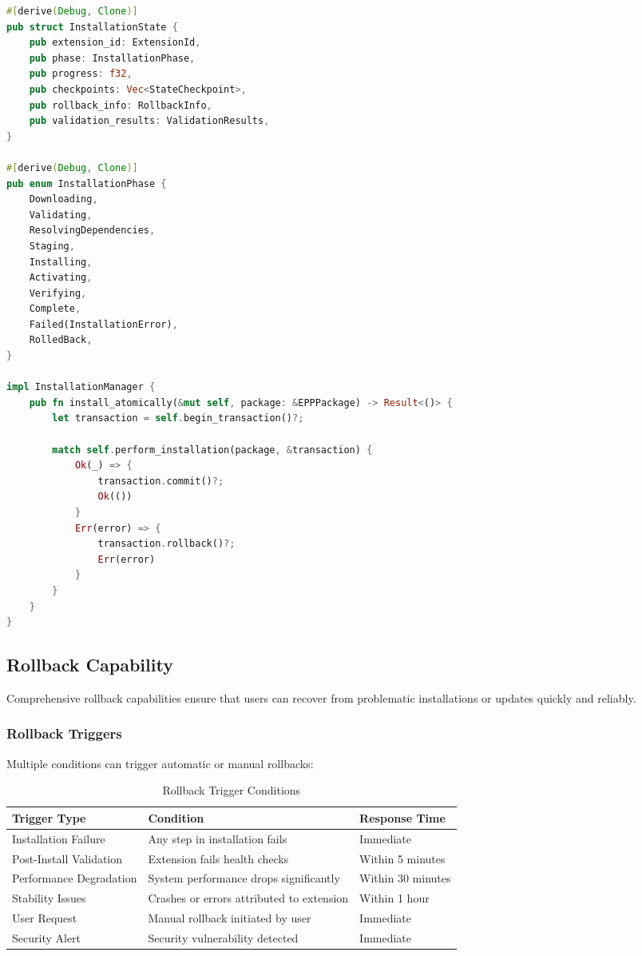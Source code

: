 \begin{lstlisting}[language=rust,caption=Installation State Tracking]
#[derive(Debug, Clone)]
pub struct InstallationState {
    pub extension_id: ExtensionId,
    pub phase: InstallationPhase,
    pub progress: f32,
    pub checkpoints: Vec<StateCheckpoint>,
    pub rollback_info: RollbackInfo,
    pub validation_results: ValidationResults,
}

#[derive(Debug, Clone)]
pub enum InstallationPhase {
    Downloading,
    Validating,
    ResolvingDependencies,
    Staging,
    Installing,
    Activating,
    Verifying,
    Complete,
    Failed(InstallationError),
    RolledBack,
}

impl InstallationManager {
    pub fn install_atomically(&mut self, package: &EPPPackage) -> Result<()> {
        let transaction = self.begin_transaction()?;
        
        match self.perform_installation(package, &transaction) {
            Ok(_) => {
                transaction.commit()?;
                Ok(())
            }
            Err(error) => {
                transaction.rollback()?;
                Err(error)
            }
        }
    }
}
\end{lstlisting}

\subsection{Rollback Capability}
\label{subsec:rollback-capability}

Comprehensive rollback capabilities ensure that users can recover from problematic installations or updates quickly and reliably.

\subsubsection{Rollback Triggers}
\label{subsubsec:rollback-triggers}

Multiple conditions can trigger automatic or manual rollbacks:

\begin{table}[h]
\centering
\caption{Rollback Trigger Conditions}
\label{tab:rollback-triggers}
\begin{tabular}{@{}lll@{}}
\toprule
\textbf{Trigger Type} & \textbf{Condition} & \textbf{Response Time} \\
\midrule
Installation Failure & Any step in installation fails & Immediate \\
Post-Install Validation & Extension fails health checks & Within 5 minutes \\
Performance Degradation & System performance drops significantly & Within 30 minutes \\
Stability Issues & Crashes or errors attributed to extension & Within 1 hour \\
User Request & Manual rollback initiated by user & Immediate \\
Security Alert & Security vulnerability detected & Immediate \\
\bottomrule
\end{tabular}
\end{table}

